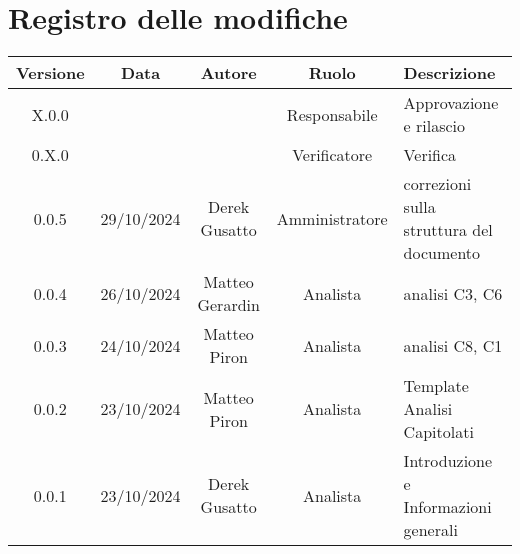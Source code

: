 
\section*{Registro delle modifiche}
\begin{table}[H]
    \begin{tabular}{|c|c|c|c|p{3cm}|}
        \hline
         \textbf{Versione} &  \textbf{Data} &  \textbf{Autore} &  \textbf{Ruolo} & \textbf{Descrizione} \\
          \hline
          X.0.0 &  &  & Responsabile & Approvazione e rilascio\\
          \hline
          0.X.0 &  &  & Verificatore & Verifica\\
            \hline
          0.0.5 & 29/10/2024 & Derek Gusatto & Amministratore &  correzioni sulla struttura del documento\\
          \hline
          0.0.4 & 26/10/2024 & Matteo Gerardin & Analista & analisi C3, C6 \\
          \hline
          0.0.3 & 24/10/2024 & Matteo Piron & Analista & analisi C8, C1 \\
        \hline
          0.0.2 & 23/10/2024 & Matteo Piron & Analista & Template Analisi Capitolati \\
          \hline
          0.0.1 & 23/10/2024 & Derek Gusatto & Analista & Introduzione e Informazioni generali \\
          
          \hline
    \end{tabular}
\end{table}